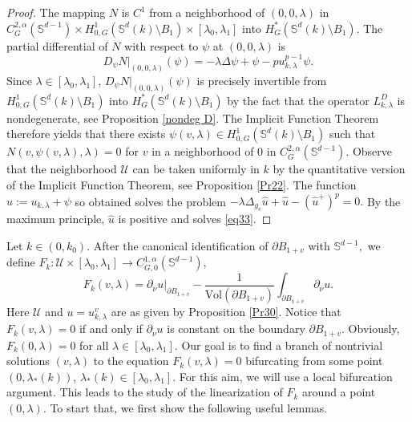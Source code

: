 \documentclass[reqno]{amsart}
\numberwithin{equation}{section}
\newenvironment{key words}{\textbf{Keywords}\mbox{  }}{ }
\begin{document}
\begin{proof}
	The mapping $N$ is $C^{1}$ from a neighborhood of $(0,0,\lambda)$ in $C_{G}^{2,\alpha}(\mathbb{S}^{d-1})\times H_{0,G}^{1}(\mathbb{S}^{d}(k)\setminus B_{1})\times[\lambda_{0},\lambda_{1}]$ into $H^{*}_G(\mathbb{S}^{d}(k)\setminus B_{1}).$ The partial differential of $N$ with respect to $\psi$ at $(0,0,\lambda)$ is
	\[D_{\psi}N|_{(0,0,\lambda)}(\psi)=-\lambda\Delta\psi+\psi-pu_{k,\lambda}^{p-1}\psi.\]
Since $\lambda\in[\lambda_{0},\lambda_{1}]$, $D_{\psi}N|_{(0,0,\lambda)}(\psi)$ is precisely invertible from $H_{0,G}^{1}(\mathbb{S}^{d}(k)\setminus B_{1})$ into $H^{*}_G(\mathbb{S}^{d}(k)\setminus B_{1})$ by the fact that the operator $L_{k, \lambda}^D$ is nondegenerate, see Proposition \ref{nondeg D}. The Implicit Function Theorem therefore yields that there exists $\psi(v,\lambda)\in H_{0,G}^{1}(\mathbb{S}^{d}(k)\setminus B_{1})$ such that $N(v,\psi(v,\lambda),\lambda)=0$ for $v$ in a neighborhood of $0$ in $C_{G}^{2,\alpha}(\mathbb{S}^{d-1})$. Observe that the neighborhood $\mathcal{U}$ can be taken uniformly in $k$ by the quantitative version of the Implicit Function Theorem, see Proposition \ref{Pr22}.
The function $\hat{u}:=u_{k,\lambda}+\psi$ so obtained solves the problem $-\lambda\Delta_{g_{v}} \hat{u}+\hat{u}-(\hat{u}^{+})^{p}=0.$ By the maximum principle, $\hat{u}$ is positive and solves \eqref{eq33}.
\end{proof}

Let $k \in (0, k_0)$. After the canonical identification of $\partial B_{1+v}$ with $\mathbb{S}^{d-1},$ we define $F_k: \mathcal{U}\times[\lambda_{0},\lambda_{1}] \rightarrow C^{1,\alpha}_{G,0}(\mathbb{S}^{d-1})$,
\begin{equation}\label{eq35}
F_k(v,\lambda)= \partial_{\nu} u \Big|_{\partial B_{1+v}}-\frac{1}{\mbox{Vol}(\partial B_{1+v})}\int_{\partial B_{1+v}}\partial_{\nu} u.
\end{equation}
Here $\mathcal{U}$ and $u=u_{k, \lambda}^v$ are as given by Proposition \ref{Pr30}. Notice that $F_k(v,\lambda)=0$ if and only if $\partial_{\nu} u$ is constant on the boundary $\partial B_{1+v}.$ Obviously, $F_k(0,\lambda)=0$ for all $\lambda\in[\lambda_{0},\lambda_{1}].$ Our goal is to find a branch of nontrivial solutions $(v,\lambda)$ to the equation $F_k(v,\lambda)=0$ bifurcating from some point $(0, \lambda_*(k))$, $\lambda_*(k) \in[\lambda_{0},\lambda_{1}].$ For this aim, we will use a local bifurcation argument. This leads to the study of the linearization of $F_k$ around a point $(0,\lambda)$. To start that, we first show the following useful lemmas.
\end{document}
